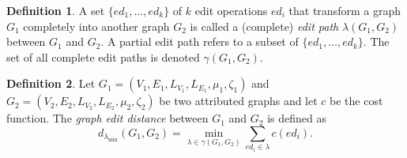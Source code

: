 \documentclass{article}
\theoremstyle{definition}
\newtheorem{definition}{Definition}[section]
\begin{document}
\begin{definition}
  A set $\{ ed_1, \dots, ed_k \}$ of $k$ edit operations $ed_i$ that transform a graph $G_1$ completely into another graph $G_2$ is called a (complete) \emph{edit path} $\lambda(G_1, G_2)$ between $G_1$ and $G_2$. A partial edit path refers to a subset of $\{ ed_1, \dots, ed_k \}$. The set of all complete edit paths is denoted $\gamma(G_1, G_2)$.
\end{definition}
\begin{definition}
  Let $G_1 = (V_1, E_1, L_{V_1}, L_{E_1}, \mu_1, \zeta_1)$ and $G_2 = (V_2, E_2, L_{V_2}, L_{E_2}, \mu_2, \zeta_2)$ be two attributed graphs and let $c$ be the cost function. The \emph{graph edit distance} between $G_1$ and $G_2$ is defined as
  \[ d_{\lambda_{\text{min}}}(G_1, G_2) = \min_{\lambda \in \gamma(G_1, G_2)} \sum_{ed_i \in \lambda} c(ed_i).\]
\end{definition}
\end{document}
